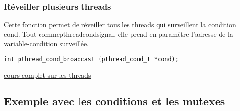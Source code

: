 \documentclass[a4paper]{article}
\begin{document}
\subsubsection{Réveiller plusieurs threads}
Cette fonction permet de réveiller tous les threads qui surveillent la condition cond. Tout comme\newline pthread\textunderscore{}cond\textunderscore{}signal, elle prend en paramètre l'adresse de la variable-condition surveillée.
\begin{lstlisting}
int pthread_cond_broadcast (pthread_cond_t *cond);
\end{lstlisting}
\href{http://franckh.developpez.com/tutoriels/posix/pthreads/}{cours complet sur les threads}
\newpage
\subsection{Exemple avec les conditions et les mutexes}
\end{document}
